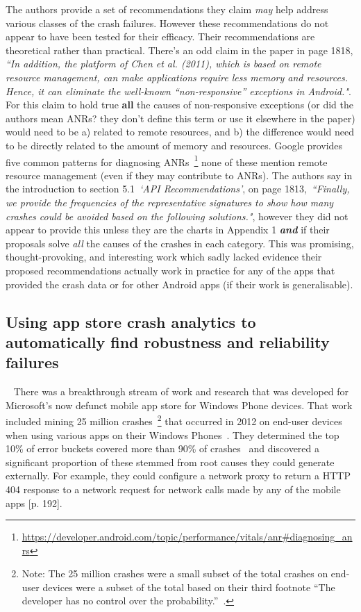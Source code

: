 The authors provide a set of recommendations they claim \emph{may} help address various classes of the crash failures. However these recommendations do not appear to have been tested for their efficacy. Their recommendations are theoretical rather than practical. There's an odd claim in the paper in page 1818, \emph{``In addition, the platform of Chen et al. (2011), which is based on remote resource management, can make applications require less memory and resources. Hence, it can eliminate the well-known “non-responsive” exceptions in Android."}. For this claim to hold true \textbf{all} the causes of non-responsive exceptions (or did the authors mean ANRs? they don't define this term or use it elsewhere in the paper) would need to be a) related to remote resources, and b) the difference would need to be directly related to the amount of memory and resources. Google provides five common patterns for diagnosing ANRs~\footnote{\url{https://developer.android.com/topic/performance/vitals/anr\#diagnosing_anrs}} none of these mention remote resource management (even if they may contribute to ANRs). The authors say in the introduction to section 5.1~\emph{`API Recommendations'}, on page 1813,~\emph{``Finally, we provide the frequencies of the representative signatures to show how many crashes could be avoided based on the following solutions."}, however they did not appear to provide this unless they are the charts in  Appendix 1 \textbf{\emph{and}} if their proposals solve \emph{all} the causes of the crashes in each category. This was promising, thought-provoking, and interesting work which sadly lacked evidence their proposed recommendations actually work in practice for any of the apps that provided the crash data or for other Android apps (if their work is generalisable).


\subsection{Using app store crash analytics to automatically find robustness and reliability failures}~\label{rw-windows-phone-store-crash-analysis-section}
There was a breakthrough stream of work and research that was developed for Microsoft's now defunct mobile app store for Windows Phone devices. That work included mining 25 million crashes~\footnote{Note: The 25 million crashes were a small subset of the total crashes on end-user devices were a subset of the total based on their third footnote ``The developer has no control over the probability.''~\cite[p. 191]{ravindrath2014_automatic_and_scalable_fault_detection_for_mobile_apps}.} that occurred in 2012 on end-user devices when using various apps on their Windows Phones~\cite[p. 190]{ravindrath2014_automatic_and_scalable_fault_detection_for_mobile_apps}. They determined the top 10\% of error buckets covered more than 90\% of crashes~\cite[p. 192]{ravindrath2014_automatic_and_scalable_fault_detection_for_mobile_apps} and discovered a significant proportion of these stemmed from root causes they could generate externally. For example, they could configure a network proxy to return a HTTP 404 response to a network request for network calls made by any of the mobile apps [p. 192].

